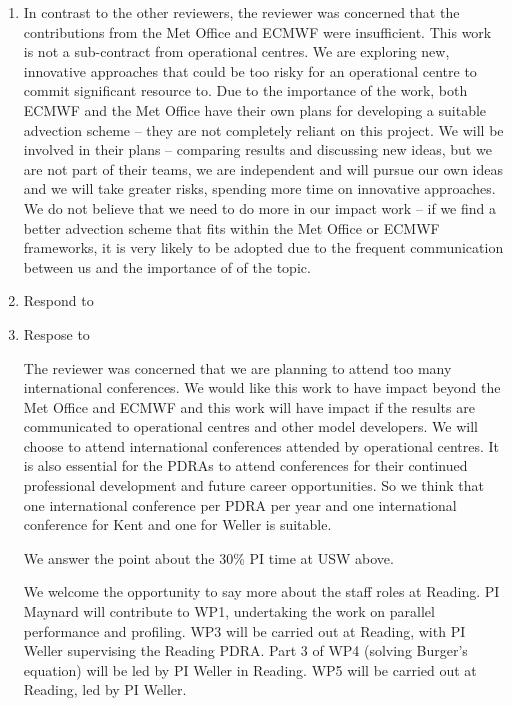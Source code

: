 \begin{enumerate}
\item In contrast to the other reviewers, the reviewer was concerned that the contributions from the Met Office and ECMWF were insufficient. 
This work is not a sub-contract from operational centres. We are exploring new, innovative approaches that could be too risky for an operational centre to commit significant resource to. Due to the importance of the work, both ECMWF and the Met Office have their own plans for developing a suitable advection scheme -- they are not completely reliant on this project. We will be involved in their plans -- comparing results and discussing new ideas, but we are not part of their teams, we are independent and will pursue our own ideas and we will take greater risks, spending more time on innovative approaches. We do not believe that we need to do more in our impact work -- if we find a better advection scheme that fits within the Met Office or ECMWF frameworks, it is very likely to be adopted due to the frequent communication between us and the importance of of the topic.

\item Respond to 

\item Respose to 

The reviewer was concerned that we are planning to attend too many international conferences. We would like this work to have impact beyond the Met Office and ECMWF and this work will have impact if the results are communicated to operational centres and other model developers. We will choose to attend international conferences attended by operational centres. It is also essential for the PDRAs to attend conferences for their continued professional development and future career opportunities. So we think that one international conference per PDRA per year and one international conference for Kent and one for Weller is suitable. 

We answer the point about the 30\% PI time at USW above.

We welcome the opportunity to say more about the staff roles at Reading. PI Maynard will contribute to WP1, undertaking the work on parallel performance and profiling. WP3 will be carried out at Reading, with PI Weller supervising the Reading PDRA. Part 3 of WP4 (solving Burger's equation) will be led by PI Weller in Reading. WP5 will be carried out at Reading, led by PI Weller.

\end{enumerate}

